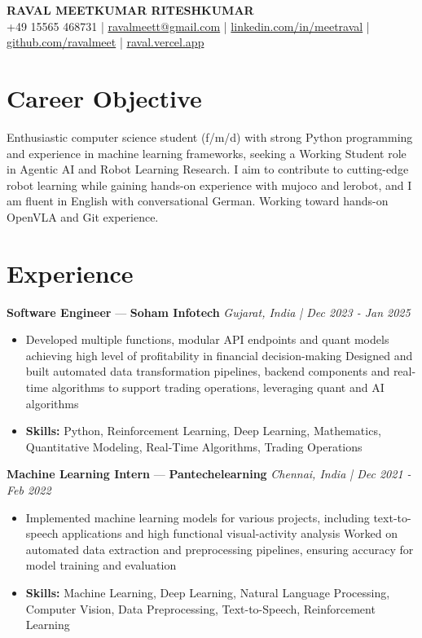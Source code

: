 \documentclass[a4paper,10pt]{article}
\begin{document}
\begin{center}
  {\Large\bfseries RAVAL MEETKUMAR RITESHKUMAR}\\[2pt]
  {\small +49 15565 468731 \;|\; \href{mailto:ravalmeett@gmail.com}{ravalmeett@gmail.com} \;|\; \href{https://www.linkedin.com/in/meetraval/}{linkedin.com/in/meetraval} \;|\; \href{https://github.com/ravalmeet}{github.com/ravalmeet} \;|\; \href{https://raval.vercel.app/}{raval.vercel.app}}
\end{center}
\vspace{-3pt}

\section*{Career Objective}
Enthusiastic computer science student (f/m/d) with strong Python programming and experience in machine learning frameworks, seeking a Working Student role in Agentic AI and Robot Learning Research. I aim to contribute to cutting-edge robot learning while gaining hands-on experience with mujoco and lerobot, and I am fluent in English with conversational German. Working toward hands-on OpenVLA and Git experience.\par

\section*{Experience}
\textbf{Software Engineer} — \textbf{Soham Infotech} \hfill \textit{Gujarat, India \;|\; Dec 2023 - Jan 2025}\par
\vspace{1pt}
\begin{itemize}
  \item Developed multiple functions, modular API endpoints and quant models achieving high level of profitability in financial decision-making Designed and built automated data transformation pipelines, backend components and real-time algorithms to support trading operations, leveraging quant and AI algorithms
  \item \textbf{Skills:} Python, Reinforcement Learning, Deep Learning, Mathematics, Quantitative Modeling, Real-Time Algorithms, Trading Operations
\end{itemize}
\vspace{3pt}
\textbf{Machine Learning Intern} — \textbf{Pantechelearning} \hfill \textit{Chennai, India \;|\; Dec 2021 - Feb 2022}\par
\vspace{1pt}
\begin{itemize}
  \item Implemented machine learning models for various projects, including text-to-speech applications and high functional visual-activity analysis Worked on automated data extraction and preprocessing pipelines, ensuring accuracy for model training and evaluation
  \item \textbf{Skills:} Machine Learning, Deep Learning, Natural Language Processing, Computer Vision, Data Preprocessing, Text-to-Speech, Reinforcement Learning
\end{itemize}
\end{document}
